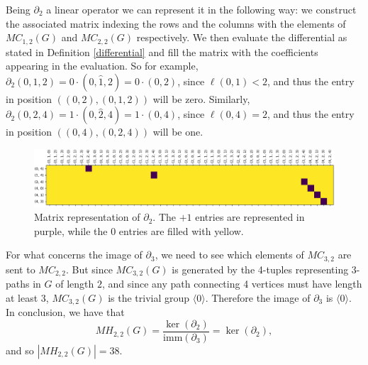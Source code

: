 \documentclass[runningheads]{llncs}
\newcommand{\imm}{\mathrm{imm}}
\begin{document}
\begin{example}
Being $\partial_2$ a linear operator we can represent it in the following way: we construct the associated matrix indexing the rows and the columns with the elements of $MC_{1,2}(G)$ and $MC_{2,2}(G)$ respectively.
We then evaluate the differential as stated in Definition \ref{differential} and fill the matrix with the coefficients appearing in the evaluation.
So for example, $\partial_2 (0,1,2)=0\cdot (0, \hat{1}, 2)=0\cdot (0, 2)$, since $\ell(0,1)<2$, and thus the entry in position $((0,2),(0,1,2))$ will be zero.
Similarly, $\partial_2 (0,2,4)=1\cdot (0, \hat{2}, 4)=1\cdot (0, 4)$, since $\ell(0,4)=2$, and thus the entry in position $((0,4),(0,2,4))$ will be one.

\begin{figure}
\hspace{-1cm}
\includegraphics[scale=0.45]{images/kernel_toy_example.png}
\caption{Matrix representation of $\partial_2$. The $+1$ entries are represented in purple, while the $0$ entries are filled with yellow.}
\end{figure}

For what concerns the image of $\partial_3$, we need to see which elements of $MC_{3,2}$ are sent to $MC_{2,2}$.
But since $MC_{3,2}(G)$ is generated by the 4-tuples representing $3$-paths in $G$ of length $2$, and since any path connecting 4 vertices must have length at least 3, $MC_{3,2}(G)$ is the trivial group $\langle 0 \rangle$.
Therefore the image of $\partial_3$ is $\langle 0 \rangle$.
In conclusion, we have that 
\[
MH_{2,2}(G)=\frac{\ker(\partial_2)}{\imm(\partial_3)}=\ker(\partial_2),
\]
and so $|MH_{2,2}(G)|=38$.
\end{example}
\end{document}
